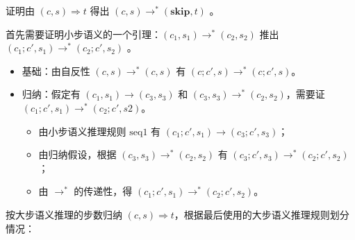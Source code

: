 \documentclass[UTF8]{ctexart}
\begin{document}
    \begin{framed}
        证明由 $(c, s) \Rightarrow t$ 得出 $(c, s) \to^{\ast} (\mathbf{skip}, t)$ 。

        首先需要证明小步语义的一个引理：$(c_1, s_1) \to^{\ast} (c_2, s_2)$ 推出 $(c_1; c', s_1) \to^{\ast} (c_2; c', s_2)$ 。

        \begin{itemize}
            \item 基础：由自反性 $(c, s) \to^{\ast} (c, s)$ 有 $(c; c', s) \to^{\ast} (c; c', s)$。
            \item 归纳：假定有 $(c_1, s_1) \to (c_3, s_3)$ 和 $(c_3, s_3) \to^{\ast} (c_2, s_2)$，需要证 $(c_1; c', s_1) \to^{\ast} (c_2; c', s2)$。
            \begin{itemize}
                \item 由小步语义推理规则 $\mathrm{seq1}$ 有 $(c_1; c', s_1) \to (c_3; c', s_3)$；
                \item 由归纳假设，根据 $(c_3, s_3) \to^{\ast} (c_2, s_2)$ 有 $(c_3; c', s_3) \to^{\ast} (c_2; c', s_2)$；
                \item 由 $\to^{\ast}$ 的传递性，得 $(c_1; c', s_1) \to^{\ast} (c_2; c', s_2)$。
            \end{itemize}
        \end{itemize}

        按大步语义推理的步数归纳 $(c, s) \Rightarrow t$，根据最后使用的大步语义推理规则划分情况：


\end{framed}
\end{document}

